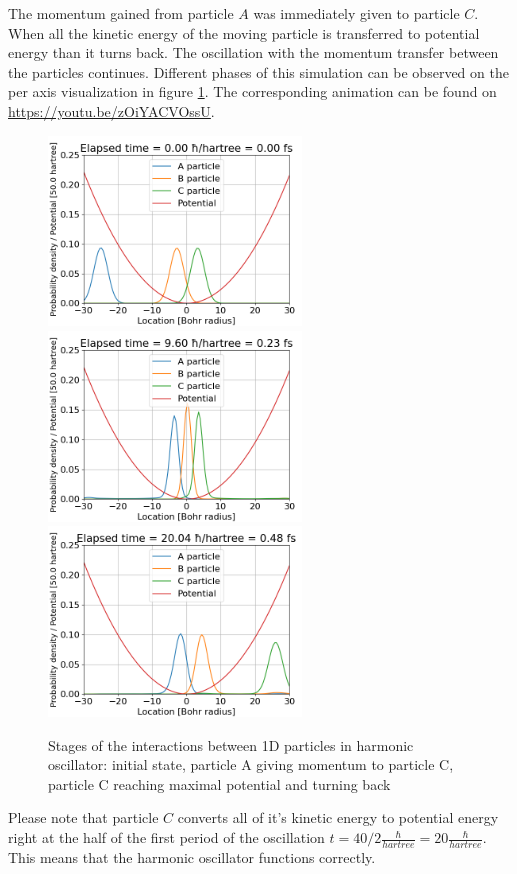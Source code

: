 The momentum gained from particle $A$ was immediately given to particle $C$.
When all the kinetic energy of the moving particle is transferred to potential energy than it turns back.
The oscillation with the momentum transfer between the particles continues.
Different phases of this simulation can be observed on the per axis visualization in figure \ref{fig:1d_particles_in_oscillator_stages}.
The corresponding animation can be found on \url{https://youtu.be/zOiYACVOssU}.
\begin{figure}
	\begin{center}
		\includegraphics[width=0.6\textwidth]{figures/1d_oscillator_01.png}
		\includegraphics[width=0.6\textwidth]{figures/1d_oscillator_02.png}
		\includegraphics[width=0.6\textwidth]{figures/1d_oscillator_03.png}
		\caption{Stages of the interactions between 1D particles in harmonic oscillator: initial state, particle A giving momentum to particle C, particle C reaching maximal potential and turning back}
		\label{fig:1d_particles_in_oscillator_stages}
	\end{center}
\end{figure}
Please note that particle $C$ converts all of it's kinetic energy to potential energy right at the half of the first period of the oscillation $t = 40 / 2 \frac{\hbar}{hartree} = 20 \frac{\hbar}{hartree}$.
This means that the harmonic oscillator functions correctly.

